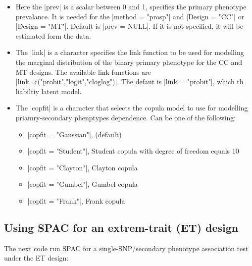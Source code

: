 \documentclass{article}\usepackage[]{graphicx}\usepackage[]{color}
\begin{document}
\begin{itemize}
\item Here the |prev| is a scalar between 0 and 1, specifies the primary phenotype prevalance.
It is needed for the |method = "prosp"| and |Design = "CC"| or |Design = "MT"|. Default is |prev = NULL|.
If it is not specified, it will be estimated form the data.

\item The |link| is a character specifies the link function to be used for modelling the marginal distribution of the binary primary phenotype for the CC and MT designs. The available link functions are |link=c("probit","logit","cloglog")|. The defaut is |link = "probit"|, which th liabiltiy latent model.

\item The |copfit| is a character that selects the copula model to use for modelling priamry-secondary phenptypes dependence. Can be one of the following:
\begin{itemize}
\item |copfit = "Gaussian"|, (default)
\item |copfit = "Student"|, Student copula with degree of freedom equals 10
\item |copfit = "Clayton"|, Clayton copula
\item |copfit = "Gumbel"|, Gumbel copula
\item |copfit = "Frank"|, Frank copula
\end{itemize}
\end{itemize}

\subsection{Using SPAC for an extrem-trait (ET) design}
\label{sec:using-SPAC-ET}
The next code run SPAC for a single-SNP/secondary phenotype association test under the ET design:
\end{document}
